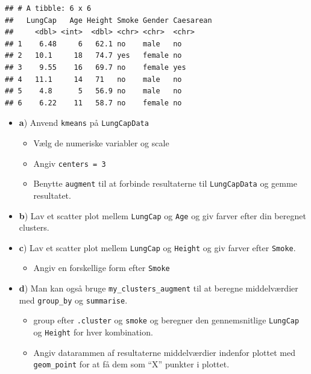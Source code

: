 \documentclass[
]{book}
\providecommand{\tightlist}{%
  \setlength{\itemsep}{0pt}\setlength{\parskip}{0pt}}
\begin{document}
\begin{verbatim}
## # A tibble: 6 x 6
##   LungCap   Age Height Smoke Gender Caesarean
##     <dbl> <int>  <dbl> <chr> <chr>  <chr>    
## 1    6.48     6   62.1 no    male   no       
## 2   10.1     18   74.7 yes   female no       
## 3    9.55    16   69.7 no    female yes      
## 4   11.1     14   71   no    male   no       
## 5    4.8      5   56.9 no    male   no       
## 6    6.22    11   58.7 no    female no
\end{verbatim}

\begin{itemize}
\item
  \textbf{a}) Anvend \texttt{kmeans} på \texttt{LungCapData}

  \begin{itemize}
  \tightlist
  \item
    Vælg de numeriske variabler og scale
  \item
    Angiv \texttt{centers\ =\ 3}
  \item
    Benytte \texttt{augment} til at forbinde resultaterne til \texttt{LungCapData} og gemme resultatet.
  \end{itemize}
\item
  \textbf{b}) Lav et scatter plot mellem \texttt{LungCap} og \texttt{Age} og giv farver efter din beregnet clusters.
\item
  \textbf{c}) Lav et scatter plot mellem \texttt{LungCap} og \texttt{Height} og giv farver efter \texttt{Smoke}.

  \begin{itemize}
  \tightlist
  \item
    Angiv en forskellige form efter \texttt{Smoke}
  \end{itemize}
\item
  \textbf{d}) Man kan også bruge \texttt{my\_clusters\_augment} til at beregne middelværdier med \texttt{group\_by} og \texttt{summarise}.

  \begin{itemize}
  \tightlist
  \item
    group efter \texttt{.cluster} og \texttt{smoke} og beregner den gennemsnitlige \texttt{LungCap} og \texttt{Height} for hver kombination.
  \item
    Angiv datarammen af resultaterne middelværdier indenfor plottet med \texttt{geom\_point} for at få dem som ``X'' punkter i plottet.
  \end{itemize}
\end{itemize}
\end{document}
